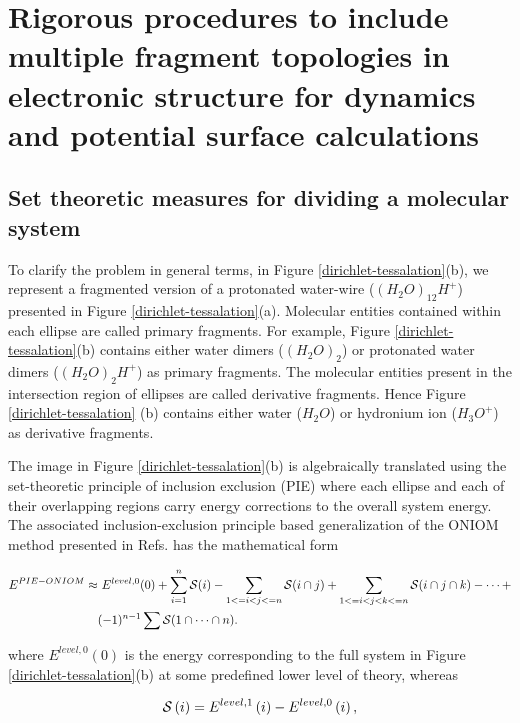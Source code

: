\chapter{Rigorous procedures to include multiple fragment topologies in
electronic structure for dynamics and potential surface calculations}

\section{Set theoretic measures for dividing a molecular system}

\label{dynafrag}
To clarify the problem in general terms, in Figure
\ref{dirichlet-tessalation}(b), we represent a fragmented version of
a protonated water-wire ($(H_{2}O)_{12}H^{+}$) presented in Figure
\ref{dirichlet-tessalation}(a). Molecular entities contained within each
ellipse are called primary fragments. For example, Figure
\ref{dirichlet-tessalation}(b) contains either water dimers ($(H_{2}O)_{2}$)
or protonated water dimers ($(H_{2}O)_{2}H^{+}$) as primary fragments. The
molecular entities present in the intersection region of ellipses
are called derivative fragments. Hence Figure \ref{dirichlet-tessalation} (b)
contains either water ($H_{2}O$) or hydronium ion ($H_{3}O^{+}$) as
derivative fragments.

The image in Figure \ref{dirichlet-tessalation}(b) is algebraically
translated using the set-theoretic principle of inclusion exclusion
(PIE)\cite{pie} where each ellipse and each of their overlapping
regions carry energy corrections to the overall system energy. The associated
inclusion-exclusion principle based generalization of the ONIOM method
\cite{oniom} presented in Refs.\cite{fragAIMD,fragAIMD-elbo,fragAIMD-CC}
has the mathematical form

\begin{align}
E^{PIE-ONIOM} \approx & ~E^{level,0}(0) + \sum^n_{i=1}{\cal S}(i) - \sum_{1<=i<j<=n}{\cal S}(i\cap
j)+\sum_{1<=i<j<k<=n}{\cal S}(i\cap j\cap k)- \cdots + \nonumber \\ & (-1)^{n-1}\sum {\cal
  S}(1\cap \cdots \cap n).
\label{eq:pie-oniom}
\end{align}

\noindent where $E^{level,0}(0)$ is the energy corresponding to the full system
in Figure \ref{dirichlet-tessalation}(b) at some predefined lower level
of theory, whereas

\begin{equation}
{\cal S}\left(i\right) = E^{level,1}\left(i \right)-E^{level,0}\left(i\right),
\label{oniombasic-2}
\end{equation}

